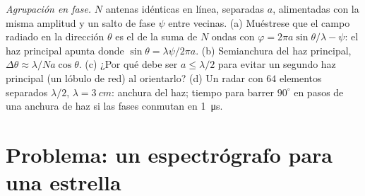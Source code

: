 \begin{exercise}[$\star\star\star$]\label{exo:b2:gratings:12}
\emph{Agrupación en fase.} $N$ antenas idénticas en línea, separadas $a$, alimentadas
con la misma amplitud y un salto de fase $\psi$ entre vecinas. (a)
Muéstrese que el campo radiado en la dirección $\theta$ es el de la
suma de $N$ ondas con $\varphi = 2\pi a\sin\theta/\lambda - \psi$: el haz principal apunta
donde $\sin\theta = \lambda\psi/2\pi a$. (b) Semianchura del haz principal, $\Delta\theta
\approx \lambda/Na\cos\theta$. (c) ¿Por qué debe ser $a \le \lambda/2$ para evitar un segundo haz principal
(un lóbulo de red) al orientarlo? (d) Un radar con $64$ elementos separados
$\lambda/2$, $\lambda = \qty{3}{cm}$: anchura del haz; tiempo para barrer $90^\circ$ en pasos de una
anchura de haz si las fases conmutan en \qty{1}{\micro s}.
\end{exercise}

\section{Problema: un espectrógrafo para una estrella}

